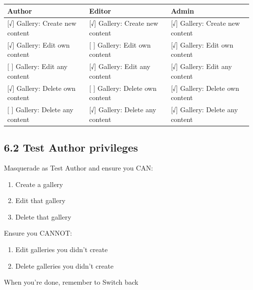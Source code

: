 \documentclass[letterpaper,10pt,english]{sphinxmanual}
\begin{document}
\begin{tabulary}{\linewidth}{|L|L|L|}
\hline
\textbf{
Author
} & \textbf{
Editor
} & \textbf{
Admin
}\\\hline

{[}√{]} Gallery: Create new content
 & 
{[}√{]} Gallery: Create new content
 & 
{[}√{]} Gallery: Create new content
\\\hline

{[}√{]}  Gallery: Edit own content
 & 
{[}  {]} Gallery: Edit own content
 & 
{[}√{]} Gallery: Edit own content
\\\hline

{[}  {]}  Gallery: Edit any content
 & 
{[}√{]} Gallery: Edit any content
 & 
{[}√{]} Gallery: Edit any content
\\\hline

{[}√{]}  Gallery: Delete own content
 & 
{[}  {]} Gallery: Delete own content
 & 
{[}√{]} Gallery: Delete own content
\\\hline

{[}  {]}  Gallery: Delete any content
 & 
{[}√{]}  Gallery: Delete any content
 & 
{[}√{]} Gallery: Delete any content
\\\hline
\end{tabulary}



\subsection{6.2 Test Author privileges}
\label{recipe:test-author-privileges}
Masquerade as Test Author and ensure you CAN:
\begin{enumerate}
\item {} 
Create a gallery

\item {} 
Edit that gallery

\item {} 
Delete that gallery

\end{enumerate}

Ensure you CANNOT:
\begin{enumerate}
\item {} 
Edit galleries you didn’t create

\item {} 
Delete galleries you didn’t create

\end{enumerate}

When you’re done, remember to Switch back
\end{document}

